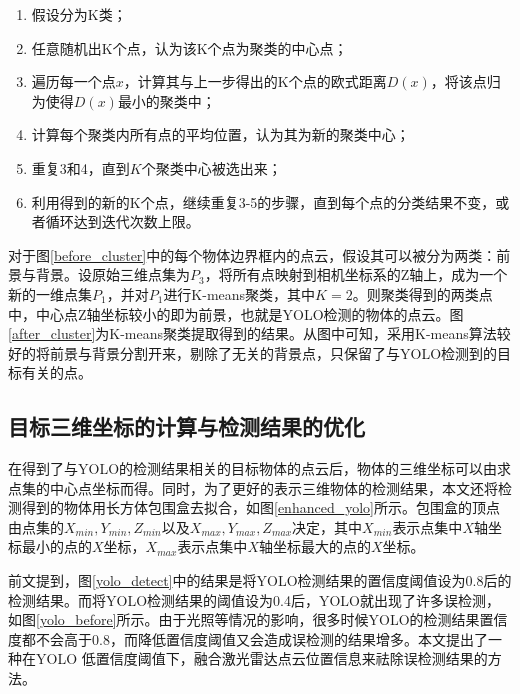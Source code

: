 \begin{enumerate}
    \item 假设分为K类；
    \item 任意随机出K个点，认为该K个点为聚类的中心点；
    \item 遍历每一个点$x$，计算其与上一步得出的K个点的欧式距离$D(x)$，将该点归为使得$D(x)$最小的聚类中；
    \item 计算每个聚类内所有点的平均位置，认为其为新的聚类中心；
    \item 重复3和4，直到$K$个聚类中心被选出来；
    \item 利用得到的新的K个点，继续重复3-5的步骤，直到每个点的分类结果不变，或者循环达到迭代次数上限。
\end{enumerate}

对于图\ref{before_cluster}中的每个物体边界框内的点云，假设其可以被分为两类：前景与背景。设原始三维点集为$P_3$，将所有点映射到相机坐标系的Z轴上，成为一个新的一维点集$P_1$，并对$P_1$进行K-means聚类，其中$K=2$。则聚类得到的两类点中，中心点Z轴坐标较小的即为前景，也就是YOLO检测的物体的点云。图\ref{after_cluster}为K-means聚类提取得到的结果。从图中可知，采用K-means算法较好的将前景与背景分割开来，剔除了无关的背景点，只保留了与YOLO检测到的目标有关的点。

\subsection{目标三维坐标的计算与检测结果的优化}

在得到了与YOLO的检测结果相关的目标物体的点云后，物体的三维坐标可以由求点集的中心点坐标而得。同时，为了更好的表示三维物体的检测结果，本文还将检测得到的物体用长方体包围盒去拟合，如图\ref{enhanced_yolo}所示。包围盒的顶点由点集的$X_{min}, Y_{min}, Z_{min}$以及$X_{max}, Y_{max}, Z_{max}$决定，其中$X_{min}$表示点集中$X$轴坐标最小的点的$X$坐标，$X_{max}$表示点集中$X$轴坐标最大的点的$X$坐标。


前文提到，图\ref{yolo_detect}中的结果是将YOLO检测结果的置信度阈值设为0.8后的检测结果。而将YOLO检测结果的阈值设为0.4后，YOLO就出现了许多误检测，如图\ref{yolo_before}所示。由于光照等情况的影响，很多时候YOLO的检测结果置信度都不会高于0.8，而降低置信度阈值又会造成误检测的结果增多。本文提出了一种在YOLO 低置信度阈值下，融合激光雷达点云位置信息来祛除误检测结果的方法。

